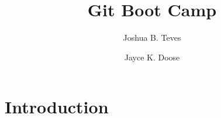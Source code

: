\documentclass[12pt]{amsbook}
\title{Git Boot Camp}
\author{Joshua B. Teves}
\author{Jayce K. Doose}
\begin{document}
\maketitle

\tableofcontents

\chapter*{Introduction}

\end{document}
